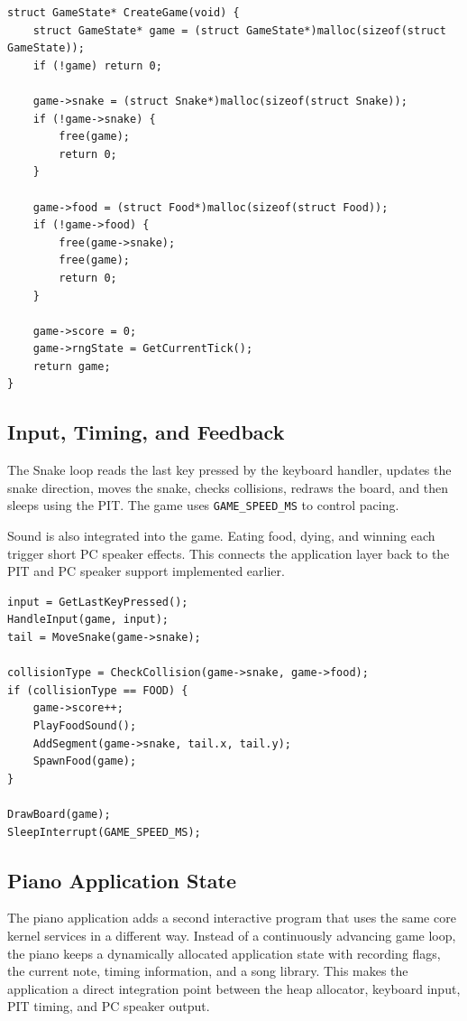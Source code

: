 \begin{listing}[H]
\begin{verbatim}
struct GameState* CreateGame(void) {
    struct GameState* game = (struct GameState*)malloc(sizeof(struct GameState));
    if (!game) return 0;

    game->snake = (struct Snake*)malloc(sizeof(struct Snake));
    if (!game->snake) {
        free(game);
        return 0;
    }

    game->food = (struct Food*)malloc(sizeof(struct Food));
    if (!game->food) {
        free(game->snake);
        free(game);
        return 0;
    }

    game->score = 0;
    game->rngState = GetCurrentTick();
    return game;
}
\end{verbatim}
\caption{Snake creates its game objects using the kernel heap allocator.}
\end{listing}
\clearpage

\subsection{Input, Timing, and Feedback}
The Snake loop reads the last key pressed by the keyboard handler, updates the snake direction, moves the snake, checks collisions, redraws the board, and then sleeps using the PIT. The game uses \texttt{GAME\_SPEED\_MS} to control pacing.

Sound is also integrated into the game. Eating food, dying, and winning each trigger short PC speaker effects. This connects the application layer back to the PIT and PC speaker support implemented earlier.

\begin{listing}[H]
\begin{verbatim}
input = GetLastKeyPressed();
HandleInput(game, input);
tail = MoveSnake(game->snake);

collisionType = CheckCollision(game->snake, game->food);
if (collisionType == FOOD) {
    game->score++;
    PlayFoodSound();
    AddSegment(game->snake, tail.x, tail.y);
    SpawnFood(game);
}

DrawBoard(game);
SleepInterrupt(GAME_SPEED_MS);
\end{verbatim}
\caption{Main Snake loop combining keyboard input, game state, sound, drawing, and PIT timing.}
\end{listing}
\clearpage

\subsection{Piano Application State}
The piano application adds a second interactive program that uses the same core kernel services in a different way. Instead of a continuously advancing game loop, the piano keeps a dynamically allocated application state with recording flags, the current note, timing information, and a song library. This makes the application a direct integration point between the heap allocator, keyboard input, PIT timing, and PC speaker output.

